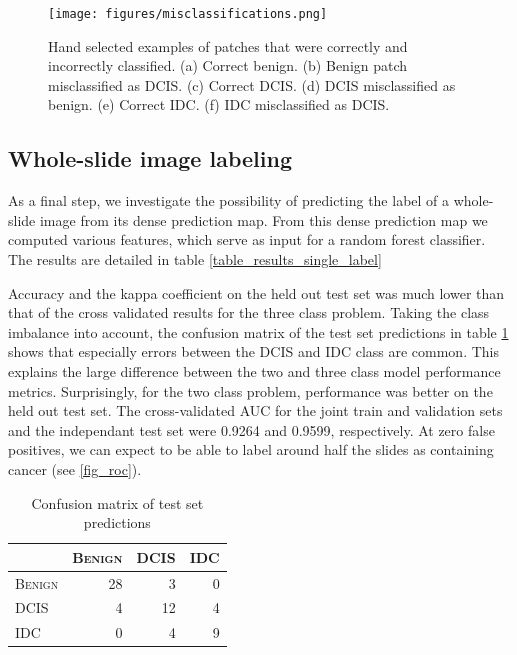 \documentclass[journal]{IEEEtran}
\begin{document}
\begin{figure}[!t]
\vspace{-0.435cm}
\centering{}
\hspace{-0.1cm}\texttt{[image: figures/misclassifications.png]}
\vspace{-0.55cm}\caption{Hand selected examples of patches that were correctly and incorrectly classified. (a) Correct benign. (b) Benign patch misclassified as DCIS. (c) Correct DCIS. (d) DCIS misclassified as benign. (e) Correct IDC. (f) IDC misclassified as DCIS. }
\label{fig_misclassifications}
\end{figure}

\subsection{Whole-slide image labeling}
As a final step, we investigate the possibility of predicting the label of a whole-slide image from its dense prediction map. From this dense prediction map we computed various features, which serve as input for a random forest classifier. The results are detailed in table \ref{table_results_single_label}



Accuracy and the kappa coefficient on the held out test set was much lower than that of the cross validated results for the three class problem. Taking the class imbalance into account, the confusion matrix of the test set predictions in table \ref{table_confusion_test} shows that especially errors between the DCIS and IDC class are common. This explains the large difference between the two and three class model performance metrics. Surprisingly, for the two class problem, performance was better on the held out test set. The cross-validated AUC for the joint train and validation sets and the independant test set were 0.9264 and 0.9599, respectively. At zero false positives, we can expect to be able to label around half the slides as containing cancer (see \ref{fig_roc}).

\begin{table}[h]
\renewcommand{\arraystretch}{1.21}
\caption{Confusion matrix of test set predictions}
\label{table_confusion_test}
\centering
\begin{tabular}{|l|rrr|}
\hline
\textsc{}&\textsc{Benign}&\textsc{DCIS}&\textsc{IDC}\\
\hline
\textsc{Benign}&28&3&0\\
\textsc{DCIS}&4& 12&4\\
\textsc{IDC}&0& 4&9\\
\hline

\end{tabular}
\end{table}
\end{document}
